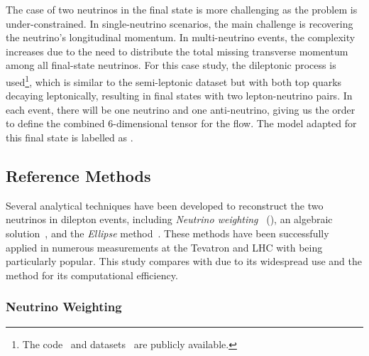 The case of two neutrinos in the final state is more challenging as the problem is under-constrained.
In single-neutrino scenarios, the main challenge is recovering the neutrino's longitudinal momentum.
In multi-neutrino events, the complexity increases due to the need to distribute the total missing transverse momentum among all final-state neutrinos.
For this case study, the dileptonic \ttbar process is used\footnote{The code~\cite{DileptonicTtbarNeutrino} and datasets~\cite{Nu2FlowsCode} are publicly available.}, which is similar to the semi-leptonic dataset but with both top quarks decaying leptonically, resulting in final states with two lepton-neutrino pairs.
In each event, there will be one neutrino and one anti-neutrino, giving us the order to define the combined 6-dimensional tensor for the flow.
The model adapted for this final state is labelled as \vvflows.

\subsection{Reference Methods}

Several analytical techniques have been developed to reconstruct the two neutrinos in dilepton \ttbar events, including \emph{Neutrino weighting}~\cite{NuW} (\vweight), an algebraic solution~\cite{AlgebraicApproachSolve}, and the \emph{Ellipse} method~\cite{EllipseMethod}.
These methods have been successfully applied in numerous measurements at the Tevatron and LHC with \vweight being particularly popular.
This study compares \vvflows with \vweight due to its widespread use and the \ellipse method for its computational efficiency.

\subsubsection{Neutrino Weighting}

